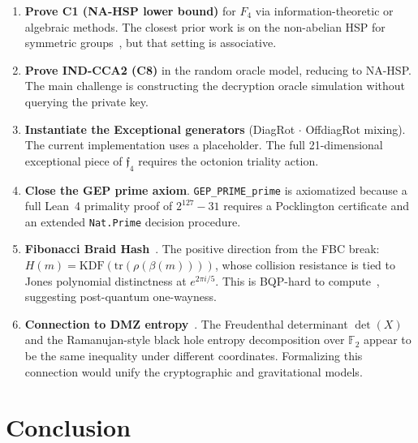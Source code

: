 \documentclass[11pt,letterpaper]{article}
\theoremstyle{definition}
\begin{document}
\begin{enumerate}

\item \textbf{Prove C1 (NA-HSP lower bound)} for $F_4$ via information-theoretic
  or algebraic methods.  The closest prior work is on the non-abelian HSP for
  symmetric groups~\cite{moore2007}, but that setting is associative.

\item \textbf{Prove IND-CCA2 (C8)} in the random oracle model, reducing to NA-HSP.
  The main challenge is constructing the decryption oracle simulation without
  querying the private key.

\item \textbf{Instantiate the Exceptional generators} (DiagRot $\cdot$ OffdiagRot
  mixing).  The current implementation uses a placeholder.  The full 21-dimensional
  exceptional piece of $\mathfrak{f}_4$ requires the octonion triality action.

\item \textbf{Close the GEP prime axiom}.  \texttt{GEP\_PRIME\_prime} is axiomatized
  because a full Lean~4 primality proof of $2^{127} - 31$ requires a Pocklington
  certificate and an extended \texttt{Nat.Prime} decision procedure.

\item \textbf{Fibonacci Braid Hash}~\cite{parr2026fbc}.  The positive direction
  from the FBC break: $H(m) = \mathrm{KDF}(\mathrm{tr}(\rho(\beta(m))))$, whose
  collision resistance is tied to Jones polynomial distinctness at $e^{2\pi i/5}$.
  This is BQP-hard to compute~\cite{aharonov2009}, suggesting post-quantum
  one-wayness.

\item \textbf{Connection to DMZ entropy}~\cite{parr2026dmz}.  The Freudenthal
  determinant $\det(X)$ and the Ramanujan-style black hole entropy decomposition
  over $\mathbb{F}_2$ appear to be the same inequality under different coordinates.
  Formalizing this connection would unify the cryptographic and gravitational
  models.
\end{enumerate}

\section{Conclusion}
\label{sec:conclusion}
\end{document}
